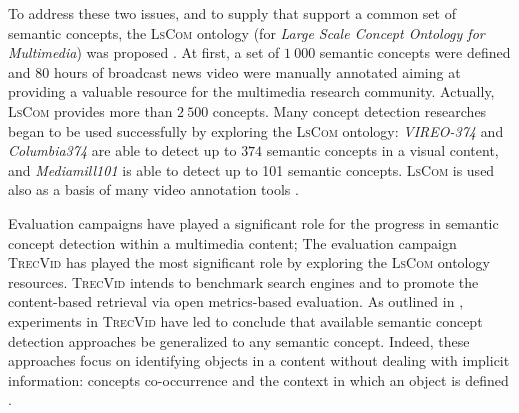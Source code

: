 	To address these two issues, and to supply  that support a common set 
	of semantic concepts, the \textsc{LsCom} ontology (for \textit{Large Scale Concept Ontology for Multimedia}) 
	was proposed \citep{Kennedy2006,Naphade2006}. At first, a set of $1~000$ semantic concepts were defined and 80 
	hours of broadcast news video were manually annotated aiming at providing a valuable resource for the multimedia 
	research community. Actually, \textsc{LsCom} provides more than $2~500$ concepts. Many concept detection researches 
	began to be used successfully by exploring the  \textsc{LsCom} ontology: \textit{VIREO-374} \citep{Jiang2007, Jiang2010} 
	and \textit{Columbia374} \citep{Yanagawa2007} are able to detect up to $374$ semantic concepts in a visual content, 
	and \textit{Mediamill101} \citep{Snoek2006} is able to detect up to 101 semantic concepts. \textsc{LsCom} is 
	used also as a basis of many video annotation tools \citep{Garnaud2006,Worring2006,Ksentini2012}.
	
	Evaluation campaigns have played a significant role for the progress in semantic concept detection within a multimedia 
	content; The evaluation campaign \textsc{TrecVid} \citep{Smeaton2009, Over2013} has played the most significant
	role \citep{Snoek2010} by exploring the \textsc{LsCom} ontology resources. \textsc{TrecVid} intends to benchmark 
	search engines and to promote the content-based retrieval via open metrics-based evaluation. 
	As outlined in \citep{Snoek2010,Over2013}, experiments in \textsc{TrecVid} have led to conclude that available 
	semantic concept detection approaches  be generalized to any semantic concept. Indeed, these approaches 
	focus on identifying  objects in a content without dealing with implicit information: concepts co-occurrence and 
	the context in which an object is defined \citep{Feng2012,Feng2016}.
	

